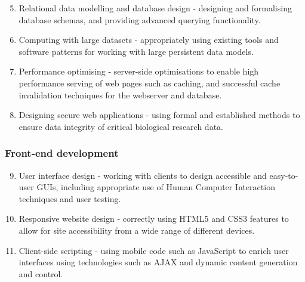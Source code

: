 \begin{enumerate}
\setcounter{enumi}{4}
\item Relational data modelling and database design - designing and formalising
  database schemas, and providing advanced querying functionality.
\item Computing with large datasets - appropriately using existing tools and
  software patterns for working with large persistent data models.
\item Performance optimising - server-side optimisations to enable high
  performance serving of web pages such as caching, and successful cache
  invalidation techniques for the webserver and database.
\item Designing secure web applications - using formal and established methods
  to ensure data integrity of critical biological research data.
\end{enumerate}

\subsubsection{Front-end development}
\begin{enumerate}
\setcounter{enumi}{8}
\item User interface design - working with clients to design accessible and
  easy-to-user GUIs, including appropriate use of Human Computer Interaction
  techniques and user testing.
\item Responsive website design - correctly using HTML5 and CSS3 features to
  allow for site accessibility from a wide range of different devices.
\item Client-side scripting - using mobile code such as JavaScript to enrich
  user interfaces using technologies such as AJAX and dynamic content generation
  and control.
\end{enumerate}
